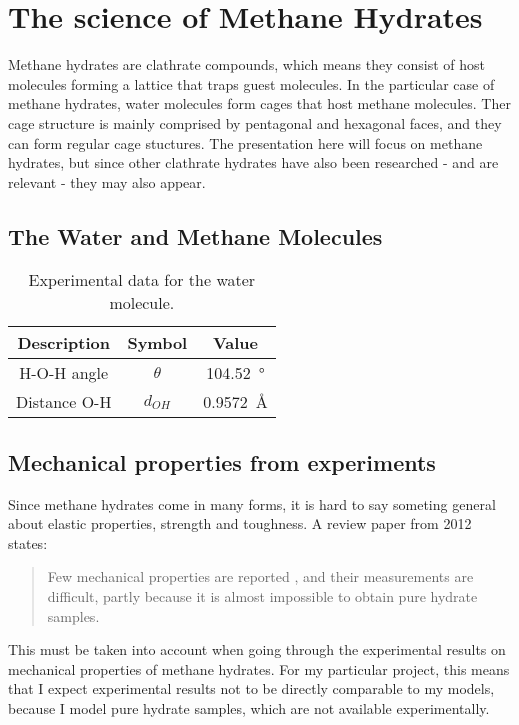 \chapter{The science of Methane Hydrates}
Methane hydrates are clathrate compounds, which means they consist of host molecules forming a lattice that traps guest molecules. In the particular case of methane hydrates, water molecules form cages that host methane molecules. Ther cage structure is mainly comprised by pentagonal and hexagonal faces, and they can form regular cage stuctures. The presentation here will focus on methane hydrates, but since other clathrate hydrates have also been researched - and are relevant - they may also appear.



\section{The Water and Methane Molecules}
\begin{table}[h!tb]
\caption{Experimental data for the water molecule.}
\label{tb:intro:h2odata}
\begin{center}
\begin{tabular}{c|c|c}
Description & Symbol & Value \\
\hline
H-O-H angle & $\theta$ & \SI{104.52}{\degree} \\
Distance O-H & $d_{OH}$ & \SI{0.9572}{\angstrom} \\
\end{tabular}
\end{center}
\end{table}


\section{Mechanical properties from experiments}
Since methane hydrates come in many forms, it is hard to say someting general about elastic properties, strength and toughness. A review paper from 2012 \citet{Ning2012} states:
\begin{quotation}
Few mechanical properties are reported , and their measurements are difficult, partly because it is almost impossible to obtain pure hydrate samples.
\end{quotation}

This must be taken into account when going through the experimental results on mechanical properties of methane hydrates. For my particular project, this means that I expect experimental results not to be directly comparable to my models, because I model pure hydrate samples, which are not available experimentally. 

